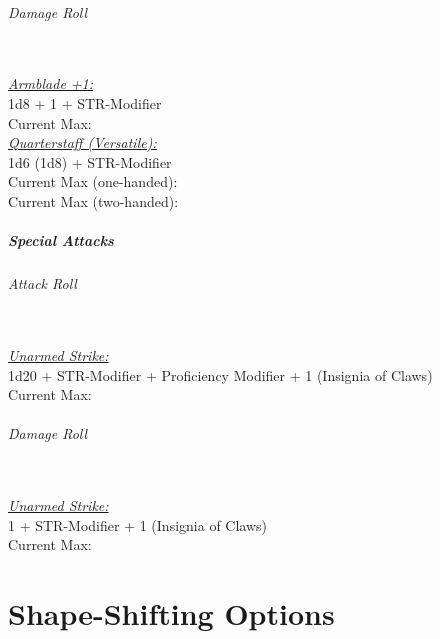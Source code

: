 \documentclass[letterpaper,openany,oneside,twocolumn]{book}
\begin{document}
\paragraph*{Damage Roll}\hfill\\
\underline{\textit{Armblade +1:}}\\
1d8 + 1 + STR-Modifier\\
\indent Current Max: 
\\
\underline{\textit{Quarterstaff (Versatile):}}\\
1d6 (1d8) + STR-Modifier\\
\indent Current Max (one-handed): \\
\indent Current Max (two-handed): 
\subsubsection*{Special Attacks}
\paragraph*{Attack Roll}\hfill\\
\underline{\textit{Unarmed Strike:}}\\
1d20 + STR-Modifier + Proficiency Modifier + 1 (Insignia of Claws)\\
\indent Current Max: 
\paragraph*{Damage Roll}\hfill\\
\underline{\textit{Unarmed Strike:}}\\
1 + STR-Modifier + 1 (Insignia of Claws)\\
\indent Current Max: 

\part*{Shape-Shifting Options}
\end{document}
